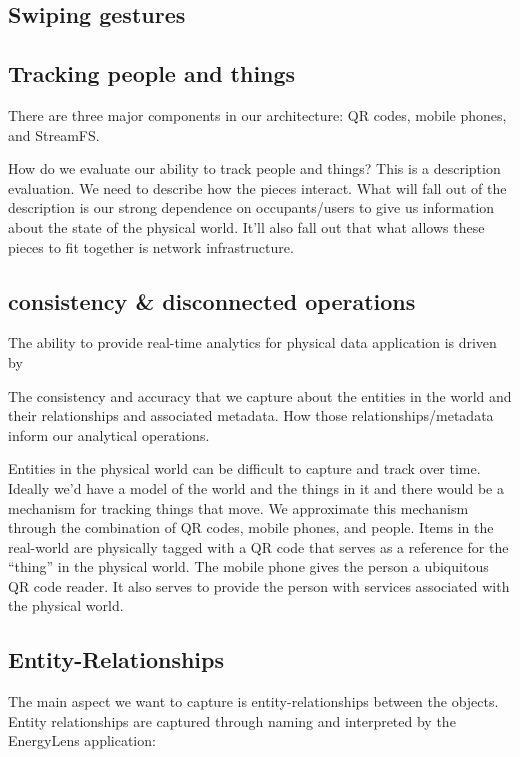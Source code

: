 \subsection{Swiping gestures}
\label{sec:swipes}

\subsection{Tracking people and things}
There are three major components in our architecture: QR codes, mobile phones, and StreamFS.

How do we evaluate our ability to track people and things?
This is a description evaluation.  We need to describe how the pieces interact.  What will fall out of the description is our strong dependence on occupants/users to give us information about the state of the physical world.  It’ll also fall out that what allows these pieces to fit together is network infrastructure.



\subsection{consistency \& disconnected operations}

The ability to provide real-time analytics for physical data application is driven by 

The consistency and accuracy that we capture about the entities in the world and their relationships and associated metadata.
How those relationships/metadata inform our analytical operations.

Entities in the physical world can be difficult to capture and track over time.  Ideally we’d have a model of the world and the things in it and there would be a mechanism for tracking things that move.  We approximate this mechanism through the combination of QR codes, mobile phones, and people.  Items in the real-world are physically tagged with a QR code that serves as a reference for the “thing” in the physical world.  The mobile phone gives the person a ubiquitous QR code reader.  It also serves to provide the person with services associated with the physical world.

\subsection{Entity-Relationships}
The main aspect we want to capture is entity-relationships between the objects.  Entity relationships are captured through naming and interpreted by the EnergyLens application:

